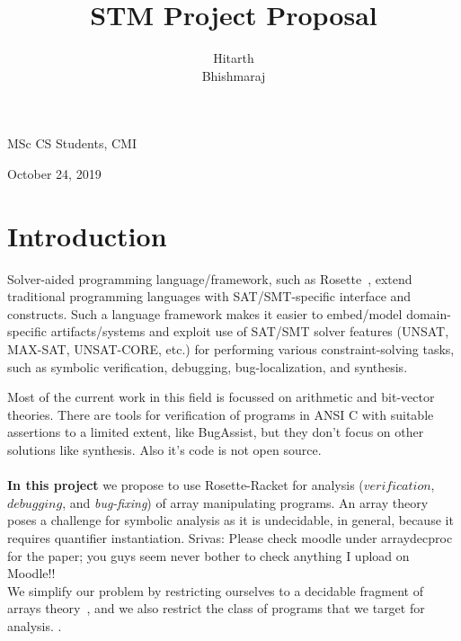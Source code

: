 \documentclass[a4paper, 12pt, notitlepage] {article}
\author{Hitarth \\ Bhishmaraj}
\title{STM Project Proposal}
\date{} %
\newcommand{\hide}[1]{}
\newcommand{\mscmt}[1]{{\color{blue} \tiny{Srivas: {#1}}}}
\begin{document}
\maketitle		


\begin{center}
MSc CS Students, CMI
\end{center}
\begin{center}
October 24, 2019
\end{center}
\newpage

\section{Introduction}

Solver-aided programming language/framework, such as Rosette~\cite{??}, extend traditional programming languages with SAT/SMT-specific interface and constructs.
Such a language framework makes it easier to embed/model domain-specific artifacts/systems and exploit use of SAT/SMT solver features (UNSAT, MAX-SAT, UNSAT-CORE, etc.) for performing various constraint-solving tasks, such as symbolic verification, debugging, bug-localization, and synthesis.
%
\hide{
domain-specific languages (SDSLs) are the languages, for a specific domain, which ease the construction of programs by giving us the ability to automate the taksk like verification, debugging and synthesis. But implementing the SDSLs from the scretch is a very hard task. To simplify our taks, we use Rosette \cite{rosette_paper}. Rosette is a framework for designing solver-aided languages, and is itself a solver-aided language embedded in Racket. Rosette helps us to easily exploit the power of SAT//SMT solver in designing solutions to domain specific constraint solving problems.\\
\\
}
%
Most of the current work in this field is focussed on arithmetic and bit-vector theories. There are tools for verification of programs in ANSI C with suitable assertions to  a limited extent, like BugAssist\cite{bugassist}, but they don't focus on other solutions like synthesis. Also it's code is not open source.\\
 \\
{\bf In this project} we propose to use Rosette-Racket for analysis ($verification$, $debugging$, and \emph{bug-fixing}) of array manipulating programs.
An array theory poses a challenge for symbolic analysis as it is undecidable, in general, because it requires quantifier instantiation.
\mscmt{Please check moodle under arraydecproc for the paper; you guys seem never bother to check anything I upload on Moodle!!}\\
We simplify our problem by restricting ourselves to a decidable fragment of arrays theory~\cite{??}, and we also restrict the class of programs that we target for analysis. .
\end{document}

